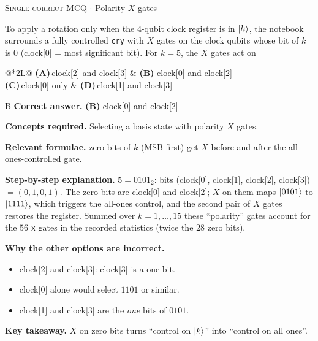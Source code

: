 \documentclass[11pt,a4paper]{article}
\newcommand{\optlabel}[1]{\textbf{(#1)}}
\newcommand{\correctlabel}[1]{\textcolor{okgreen}{\textbf{(#1)}\,\ding{51}}}
\newenvironment{qitem}[1]{\begin{list}{}{\setlength{\leftmargin}{3.3em}\setlength{\labelwidth}{3.1em}%
  \setlength{\labelsep}{0.2em}\setlength{\topsep}{3pt}\setlength{\parsep}{3pt}}\item[\textbf{Q.#1}\hfill]}{\end{list}}
\newcommand{\qsep}{\par\vspace{2pt}{\color{black!15}\hrule}\vspace{4pt}}
\newcommand{\qmeta}[2]{{\footnotesize\color{black!60}\textsc{#1} \;$\cdot$\; #2}\par}
\begin{document}
\begin{qitem}{28}
\qmeta{Single-correct MCQ}{Polarity $X$ gates}
To apply a rotation only when the 4-qubit clock register is in $\ket k$, the notebook surrounds a fully controlled \texttt{cry} with $X$ gates on the clock qubits whose bit of $k$ is
0 (clock[0] = most significant bit). For $k = 5$, the $X$ gates act on
\par\smallskip\noindent\begin{tabularx}{\linewidth}{@{}*{2}{L}@{}}
\optlabel{A}\,clock[2] and clock[3] & \correctlabel{B}\,clock[0] and clock[2] \\[3pt]
\optlabel{C}\,clock[0] only & \optlabel{D}\,clock[1] and clock[3]
\end{tabularx}
\end{qitem}
\begin{solbox}{B}
\textbf{\color{brand}Correct answer.} \textcolor{okgreen}{\textbf{(B)}} clock[0] and clock[2]

\textbf{\color{brand}Concepts required.} Selecting a basis state with polarity $X$ gates.

\textbf{\color{brand}Relevant formulae.} zero bits of $k$ (MSB first) get $X$ before and after the all-ones-controlled gate.

\textbf{\color{brand}Step-by-step explanation.} $5 = 0101_2$: bits (clock[0], clock[1], clock[2], clock[3]) $= (0, 1, 0, 1)$. The zero bits are clock[0] and clock[2]; $X$ on them maps $\ket{0101}$ to $\ket{1111}$, which triggers the
all-ones control, and the second pair of $X$ gates restores the register. Summed over $k = 1, \dots, 15$ these ``polarity'' gates account for the
$56$ \texttt{x} gates in the recorded statistics (twice the 28 zero bits).

\textbf{\color{brand}Why the other options are incorrect.}
\begin{itemize}[leftmargin=2.4em, itemsep=1pt, topsep=2pt]
\item[\textbf{(A)}] clock[2] and clock[3]: clock[3] is a one bit.
\item[\textbf{(C)}] clock[0] alone would select $1101$ or similar.
\item[\textbf{(D)}] clock[1] and clock[3] are the \emph{one} bits of $0101$.
\end{itemize}
\textbf{\color{brand}Key takeaway.} $X$ on zero bits turns ``control on $\ket k$'' into ``control on all ones''.
\end{solbox}
\qsep
\end{document}
